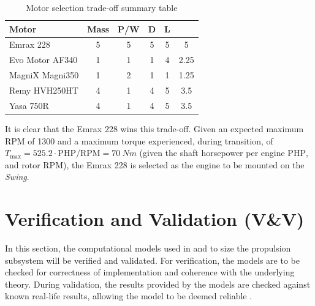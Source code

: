 \begin{table}[H]
    \centering
    \caption{Motor selection trade-off summary table}
    \label{tab:motortradeoff}
    \begin{tabular}{l||S|S|S|S||S[table-format=1.1, table-auto-round]}
        \toprule
        \textbf{Motor} & \textbf{Mass}          & \textbf{P/W}           & \textbf{D}             & \textbf{L} &  \\\bottomrule
        Emrax 228                            & 5  & 5  & 5  & 5 & 5 \\
        Evo Motor AF340                      & 1    & 1    & 1    & 4 & 2.25 \\
        MagniX Magni350                      & 1    & 2 & 1    & 1 & 1.25 \\
        Remy HVH250HT                        & 4 & 1    & 4 & 5 & 3.5 \\
        Yasa 750R
        & 4 & 1    & 4 & 5 & 3.5 \\
        \toprule
    \end{tabular}
\end{table}

It is clear that the Emrax 228 wins this trade-off.
Given an expected maximum RPM of 1300 and a maximum torque experienced, during transition, of $T_{\max}=525.2\cdot \mathrm{PHP}/\mathrm{RPM}=\qty{70}{Nm}$ (given the shaft horsepower per engine $\mathrm{PHP}$, and rotor RPM), the Emrax 228 is selected as the engine to be mounted on the \textit{Swing}.


\section{Verification and Validation (V\&V)}
\label{sec:propulsionVandV}
In this section, the computational models used in  and  to size the propulsion subsystem will be verified and validated.
For verification, the models are to be checked for correctness of implementation and coherence with the underlying theory.
During validation, the results provided by the models are checked against known real-life results, allowing the model to be deemed reliable \cite{dsePMSESlides1}.

